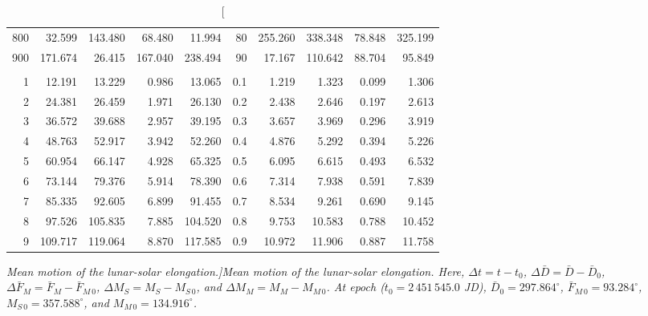 \begin{table}
\begin{tabular}{rrrrr|rrrrr}
800 &  32.599 & 143.480 &  68.480 &  11.994 & 80 & 255.260 & 338.348 &  78.848 & 325.199\\
900 & 171.674 &  26.415 & 167.040 & 238.494 & 90 &  17.167 & 110.642 &  88.704 &  95.849\\
&&&&&&&&&\\
1 &  12.191 &  13.229 &   0.986 &  13.065 & 0.1 &   1.219 &   1.323 &   0.099 &   1.306\\
2 &  24.381 &  26.459 &   1.971 &  26.130 & 0.2 &   2.438 &   2.646 &   0.197 &   2.613\\
3 &  36.572 &  39.688 &   2.957 &  39.195 & 0.3 &   3.657 &   3.969 &   0.296 &   3.919\\
4 &  48.763 &  52.917 &   3.942 &  52.260 & 0.4 &   4.876 &   5.292 &   0.394 &   5.226\\
5 &  60.954 &  66.147 &   4.928 &  65.325 & 0.5 &   6.095 &   6.615 &   0.493 &   6.532\\
6 &  73.144 &  79.376 &   5.914 &  78.390 & 0.6 &   7.314 &   7.938 &   0.591 &   7.839\\
7 &  85.335 &  92.605 &   6.899 &  91.455 & 0.7 &   8.534 &   9.261 &   0.690 &   9.145\\
8 &  97.526 & 105.835 &   7.885 & 104.520 & 0.8 &   9.753 &  10.583 &   0.788 &  10.452\\
9 & 109.717 & 119.064 &   8.870 & 117.585 & 0.9 &  10.972 &  11.906 &   0.887 &  11.758\\
\end{tabular}
\caption[\em  Mean motion of the lunar-solar elongation.]{\em Mean motion of the lunar-solar elongation.  Here, $\Delta t = t-t_0$, $\Delta \bar{D}= \bar{D}-\bar{D}_0$, $\Delta \bar{F}_M= \bar{F}_M-\bar{F}_{M\,0}$,  
$\Delta M_S = M_S - M_{S\,0}$, and $\Delta M_M= M_M-M_{M\,0}$. 
At epoch  ($t_0 = 2\,451\,545.0$ JD), $\bar{D}_0 = 297.864^\circ$, $\bar{F}_{M\,0} = 93.284^\circ$,
$M_{S\,0} = 357.588^\circ$, and $M_{M\,0} = 134.916^\circ$. }\label{telon}
\end{table}

